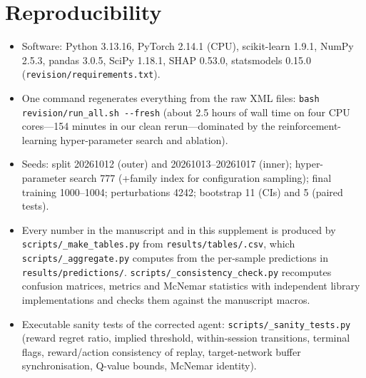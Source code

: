 \section{Reproducibility}
\label{sec:s-repro}
\begin{itemize}
\item Software: Python 3.13.16, PyTorch 2.14.1 (CPU), scikit-learn 1.9.1, NumPy 2.5.3, pandas 3.0.5, SciPy 1.18.1, SHAP 0.53.0, statsmodels 0.15.0 (\texttt{revision/\allowbreak requirements.txt}).
\item One command regenerates everything from the raw XML files: \texttt{bash revision/\allowbreak run\_all.sh -{}-fresh} (about 2.5 hours of wall time on four CPU cores---154 minutes in our clean rerun---dominated by the reinforcement-learning hyper-parameter search and ablation).
\item Seeds: split 20261012 (outer) and 20261013--20261017 (inner); hyper-parameter search 777 (+family index for configuration sampling); final training 1000--1004; perturbations 4242; bootstrap 11 (CIs) and 5 (paired tests).
\item Every number in the manuscript and in this supplement is produced by \texttt{scripts/\_make\_tables.py} from \texttt{results/\allowbreak tables/\allowbreak *.csv}, which \texttt{scripts/\_aggregate.py} computes from the per-sample predictions in \texttt{results/\allowbreak predictions/\allowbreak }. \texttt{scripts/\_consistency\_check.py} recomputes confusion matrices, metrics and McNemar statistics with independent library implementations and checks them against the manuscript macros.
\item Executable sanity tests of the corrected agent: \texttt{scripts/\_sanity\_tests.py} (reward regret ratio, implied threshold, within-session transitions, terminal flags, reward/action consistency of replay, target-network buffer synchronisation, Q-value bounds, McNemar identity).
\end{itemize}
